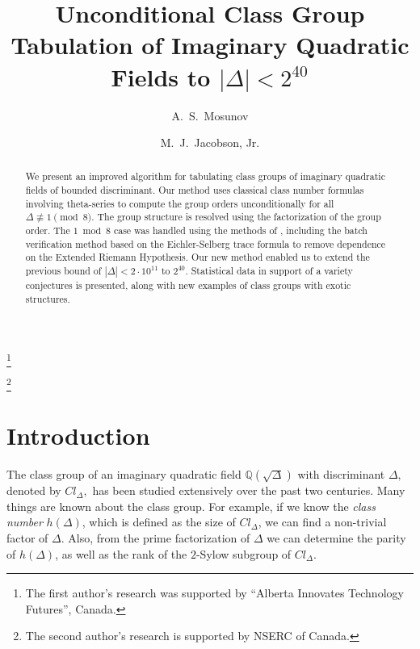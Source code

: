 \documentclass{mcom-l}
\theoremstyle{definition}
\begin{document}
\title[Unconditional Class Group Tabulation to $2^{40}$]{Unconditional
  Class Group Tabulation of Imaginary Quadratic Fields to $|\Delta| < 2^{40}$}

\author{A.~S.\ Mosunov}
\address{University of Waterloo \\
                200 University Ave W,
                Waterloo, Ontario \\ Canada N2L 3G1}
\thanks{The first author's research was supported by ``Alberta Innovates Technology Futures'', Canada.}

\author{M.~J.\ Jacobson, Jr.}
\address{University of Calgary \\
                2500 University Drive NW,
                Calgary, Alberta \\ Canada T2N 1N4}
\thanks{The second author's research is supported by NSERC of Canada.}


\begin{abstract}
We present an improved algorithm for tabulating class groups of
imaginary quadratic fields of bounded discriminant.  Our method uses
classical class number formulas involving theta-series to compute the
group orders unconditionally for all $\Delta \not \equiv 1 \pmod{8}.$ The
group structure is resolved using the factorization of the group
order.  The $1 \bmod 8$ case was handled using the methods of
\cite{jacobson}, including the batch verification method based on the
Eichler-Selberg trace formula to remove dependence on the Extended
Riemann Hypothesis.  Our new method enabled us to extend the
previous bound of $|\Delta| < 2 \cdot 10^{11}$ to $2^{40}$.
Statistical data in support of a variety conjectures is presented,
along with new examples of class groups with exotic structures.
\end{abstract}

\maketitle

\section{Introduction} \label{sec:intro}

The class group of an imaginary quadratic field ${{\mathbb{{Q}}}}(\sqrt{\Delta})$ with
discriminant $\Delta,$ denoted by $Cl_\Delta,$ has been studied
extensively over the past two centuries.  Many things are known about
the class group. For example, if we know the \emph{class number}
$h(\Delta)$, which is defined as the size of $Cl_\Delta$, we can find
a non-trivial factor of $\Delta$. Also, from the prime factorization
of $\Delta$ we can determine the parity of $h(\Delta)$, as well as the
rank of the $2$-Sylow subgroup of $Cl_\Delta.$
\end{document}
